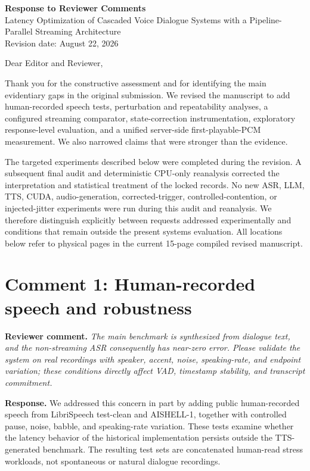 \documentclass[11pt]{article}
\newcommand{\reviewcomment}[1]{\vspace{0.4em}\noindent\textbf{Reviewer comment.} \emph{#1}}
\newcommand{\response}{\vspace{0.25em}\noindent\textbf{Response.} }
\begin{document}
\begin{center}
{\Large\bfseries Response to Reviewer Comments}\\[0.6em]
{\large Latency Optimization of Cascaded Voice Dialogue Systems with a Pipeline-Parallel Streaming Architecture}\\[0.4em]
Revision date: August 22, 2026
\end{center}

Dear Editor and Reviewer,

Thank you for the constructive assessment and for identifying the main evidentiary gaps in the original submission. We revised the manuscript to add human-recorded speech tests, perturbation and repeatability analyses, a configured streaming comparator, state-correction instrumentation, exploratory response-level evaluation, and a unified server-side first-playable-PCM measurement. We also narrowed claims that were stronger than the evidence.

The targeted experiments described below were completed during the revision. A subsequent final audit and deterministic CPU-only reanalysis corrected the interpretation and statistical treatment of the locked records. No new ASR, LLM, TTS, CUDA, audio-generation, corrected-trigger, controlled-contention, or injected-jitter experiments were run during this audit and reanalysis. We therefore distinguish explicitly between requests addressed experimentally and conditions that remain outside the present systems evaluation. All locations below refer to physical pages in the current 15-page compiled revised manuscript.

\section*{Comment 1: Human-recorded speech and robustness}

\reviewcomment{The main benchmark is synthesized from dialogue text, and the non-streaming ASR consequently has near-zero error. Please validate the system on real recordings with speaker, accent, noise, speaking-rate, and endpoint variation; these conditions directly affect VAD, timestamp stability, and transcript commitment.}

\response We addressed this concern in part by adding public human-recorded speech from LibriSpeech test-clean and AISHELL-1, together with controlled pause, noise, babble, and speaking-rate variation. These tests examine whether the latency behavior of the historical implementation persists outside the TTS-generated benchmark. The resulting test sets are concatenated human-read stress workloads, not spontaneous or natural dialogue recordings.
\end{document}
